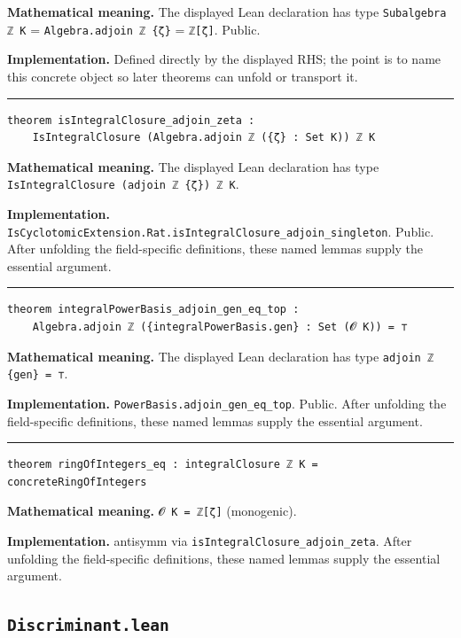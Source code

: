 \documentclass[UTF8,a4paper,11pt,fontset=fandol]{ctexart}
\theoremstyle{definition}
\newcommand{\statementsep}{\par\medskip\hrule\medskip}
\begin{document}
\noindent\textbf{Mathematical meaning.} The displayed Lean declaration has type \texttt{Subalgebra ℤ K} = \texttt{Algebra.\allowbreak{}adjoin ℤ \{ζ\}} = \texttt{ℤ[ζ]}. Public.\par
\noindent\textbf{Implementation.} Defined directly by the displayed RHS; the point is to name this concrete object so later theorems can unfold or transport it.\par
\statementsep
\begin{verbatim}
theorem isIntegralClosure_adjoin_zeta :
    IsIntegralClosure (Algebra.adjoin ℤ ({ζ} : Set K)) ℤ K
\end{verbatim}
\noindent\textbf{Mathematical meaning.} The displayed Lean declaration has type \texttt{IsIntegralClosure (adjoin ℤ \{ζ\}) ℤ K}.\par
\noindent\textbf{Implementation.} \texttt{IsCyclotomicExtension.\allowbreak{}Rat.\allowbreak{}isIntegralClosure\_\allowbreak{}adjoin\_\allowbreak{}singleton}. Public. After unfolding the field-specific definitions, these named lemmas supply the essential argument.\par
\statementsep
\begin{verbatim}
theorem integralPowerBasis_adjoin_gen_eq_top :
    Algebra.adjoin ℤ ({integralPowerBasis.gen} : Set (𝓞 K)) = ⊤
\end{verbatim}
\noindent\textbf{Mathematical meaning.} The displayed Lean declaration has type \texttt{adjoin ℤ \{gen\} = ⊤}.\par
\noindent\textbf{Implementation.} \texttt{PowerBasis.\allowbreak{}adjoin\_\allowbreak{}gen\_\allowbreak{}eq\_\allowbreak{}top}. Public. After unfolding the field-specific definitions, these named lemmas supply the essential argument.\par
\statementsep
\begin{verbatim}
theorem ringOfIntegers_eq : integralClosure ℤ K = concreteRingOfIntegers
\end{verbatim}
\noindent\textbf{Mathematical meaning.} \texttt{𝓞 K = ℤ[ζ]} (monogenic).\par
\noindent\textbf{Implementation.} antisymm via \texttt{isIntegralClosure\_\allowbreak{}adjoin\_\allowbreak{}zeta}. After unfolding the field-specific definitions, these named lemmas supply the essential argument.\par

\subsection{\texttt{Discriminant.lean}}
\end{document}
